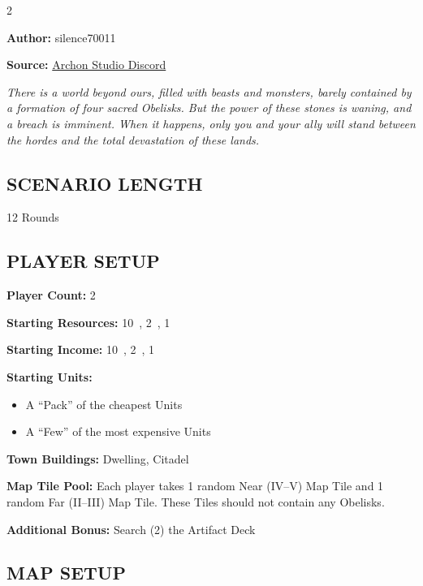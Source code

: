 
\begin{multicols}{2}

\textbf{Author:} silence70011

\textbf{Source:} \href{https://discord.com/channels/740870068178649108/1233112440322002964/1233112440322002964}{Archon Studio Discord}

\textit{There is a world beyond ours, filled with beasts and monsters, barely contained by a formation of four sacred Obelisks.
  But the power of these stones is waning, and a breach is imminent.
  When it happens, only you and your ally will stand between the hordes and the total devastation of these lands.
}

\subsection*{\MakeUppercase{Scenario Length}}

12 Rounds

\subsection*{\MakeUppercase{Player Setup}}

\textbf{Player Count:} 2

\textbf{Starting Resources:} 10~, 2~, 1~

\textbf{Starting Income:} 10~, 2~, 1~

\textbf{Starting Units:}
\begin{itemize}
  \item A ``Pack'' of the cheapest  Units
  \item A ``Few'' of the most expensive  Units
\end{itemize}

\textbf{Town Buildings:}  Dwelling, Citadel

\textbf{Map Tile Pool:} Each player takes 1 random Near (IV--V) Map Tile and 1 random Far (II--III) Map Tile. These Tiles should not contain any Obelisks.

\textbf{Additional Bonus:} Search (2) the Artifact Deck

\vspace*{\fill}\columnbreak

\subsection*{\MakeUppercase{Map Setup}}


\end{multicols}
